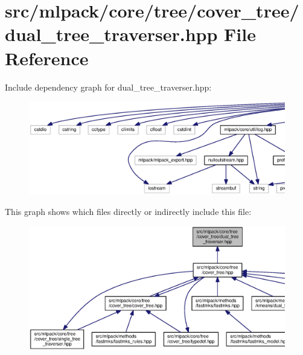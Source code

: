 \section{src/mlpack/core/tree/cover\+\_\+tree/dual\+\_\+tree\+\_\+traverser.hpp File Reference}
\label{cover__tree_2dual__tree__traverser_8hpp}
Include dependency graph for dual\+\_\+tree\+\_\+traverser.\+hpp\+:
\nopagebreak
\begin{figure}[H]
\begin{center}
\leavevmode
\includegraphics[width=350pt]{cover__tree_2dual__tree__traverser_8hpp__incl}
\end{center}
\end{figure}
This graph shows which files directly or indirectly include this file\+:
\nopagebreak
\begin{figure}[H]
\begin{center}
\leavevmode
\includegraphics[width=350pt]{cover__tree_2dual__tree__traverser_8hpp__dep__incl}
\end{center}
\end{figure}
